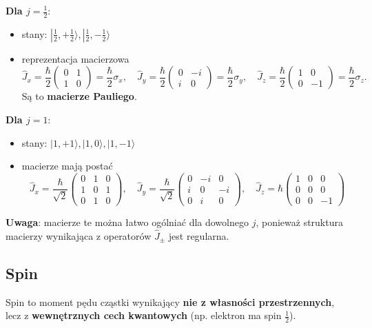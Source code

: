 \textbf{Dla $j = \frac{1}{2}$}:
\begin{itemize}
\item stany: $| \tfrac{1}{2}, +\tfrac{1}{2} \rangle, | \tfrac{1}{2}, -\tfrac{1}{2} \rangle$
\item reprezentacja macierzowa
$$
\hat{J}_x = \frac{\hbar}{2}
\begin{pmatrix}
0 & 1 \\
1 & 0
\end{pmatrix}
= \frac{\hbar}{2} \sigma_x,
\quad
\hat{J}_y = \frac{\hbar}{2}
\begin{pmatrix}
0 & -i \\
i & 0
\end{pmatrix}
= \frac{\hbar}{2} \sigma_y,
\quad
\hat{J}_z = \frac{\hbar}{2}
\begin{pmatrix}
1 & 0 \\
0 & -1
\end{pmatrix}
= \frac{\hbar}{2} \sigma_z.
$$
Są to \textbf{macierze Pauliego}.
\end{itemize}

\textbf{Dla $j = 1$}:
\begin{itemize}
\item stany: $|1, +1\rangle, |1, 0\rangle, |1, -1\rangle$
\item macierze mają postać
$$
\hat{J}_x = \frac{\hbar}{\sqrt{2}} 
\begin{pmatrix}
0 & 1 & 0 \\
1 & 0 & 1 \\
0 & 1 & 0
\end{pmatrix},
\quad
\hat{J}_y = \frac{\hbar}{\sqrt{2}} 
\begin{pmatrix}
0 & -i & 0 \\
i & 0 & -i \\
0 & i & 0
\end{pmatrix},
\quad
\hat{J}_z = \hbar 
\begin{pmatrix}
1 & 0 & 0 \\
0 & 0 & 0 \\
0 & 0 & -1
\end{pmatrix}
$$
\end{itemize}

\textbf{Uwaga}: macierze te można łatwo ogólniać dla dowolnego $j$, ponieważ struktura macierzy wynikająca z operatorów $\hat{J}_\pm$ jest regularna.

\subsection{Spin}
Spin to moment pędu cząstki wynikający \textbf{nie z własności przestrzennych}, lecz z \textbf{wewnętrznych cech kwantowych} (np. elektron ma spin $\frac{1}{2}$).

